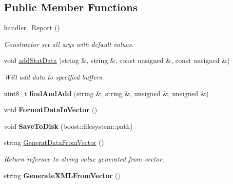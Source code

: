 \subsection*{Public Member Functions}
\begin{DoxyCompactItemize}
\item 
\hypertarget{classhandler__Report_a69a82b65c02449796be662b897ee56fc}{
\hyperlink{classhandler__Report_a69a82b65c02449796be662b897ee56fc}{handler\_\-Report} ()}
\label{classhandler__Report_a69a82b65c02449796be662b897ee56fc}

\begin{DoxyCompactList}\small\item\em Constractor set all args with default values. \item\end{DoxyCompactList}\item 
\hypertarget{classhandler__Report_a17d2a7d4c03abde1b5ad700cfdbc840f}{
void \hyperlink{classhandler__Report_a17d2a7d4c03abde1b5ad700cfdbc840f}{addStatData} (string \&, string \&, const unsigned \&, const unsigned \&)}
\label{classhandler__Report_a17d2a7d4c03abde1b5ad700cfdbc840f}

\begin{DoxyCompactList}\small\item\em Will add data to specified buffers. \item\end{DoxyCompactList}\item 
\hypertarget{classhandler__Report_a489dfe1d073ff52f340eee065b90181d}{
uint8\_\-t {\bfseries findAndAdd} (string \&, string \&, unsigned \&, unsigned \&)}
\label{classhandler__Report_a489dfe1d073ff52f340eee065b90181d}

\item 
\hypertarget{classhandler__Report_a56de9bfebe51073d5d85d0660418cd06}{
void {\bfseries FormatDataInVector} ()}
\label{classhandler__Report_a56de9bfebe51073d5d85d0660418cd06}

\item 
\hypertarget{classhandler__Report_a566af7550041c738548f29da0fd4a9ea}{
void {\bfseries SaveToDisk} (boost::filesystem::path)}
\label{classhandler__Report_a566af7550041c738548f29da0fd4a9ea}

\item 
\hypertarget{classhandler__Report_ab389a775c2650f0a5954be52c9a362a3}{
string \hyperlink{classhandler__Report_ab389a775c2650f0a5954be52c9a362a3}{GeneratDataFromVector} ()}
\label{classhandler__Report_ab389a775c2650f0a5954be52c9a362a3}

\begin{DoxyCompactList}\small\item\em Return refernce to string value generated from vector. \item\end{DoxyCompactList}\item 
\hypertarget{classhandler__Report_ae9889e1bb0a6a23d35a7a513a2f4056f}{
string {\bfseries GenerateXMLFromVector} ()}
\label{classhandler__Report_ae9889e1bb0a6a23d35a7a513a2f4056f}

\end{DoxyCompactItemize}
